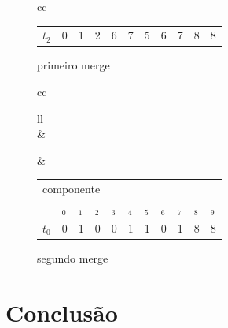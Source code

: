 \documentclass[12pt]{article}
\begin{document}
\begin{figure}[h!]
\begin{minipage}[b]{0.5\textwidth}
{\begin{tabular}{cc}
\begin{tabular}{lllllllllll}
\multicolumn{1}{l|}{$t_2$} & \multicolumn{1}{l|}{0} & \multicolumn{1}{l|}{1} & \multicolumn{1}{l|}{2} & \multicolumn{1}{l|}{6} & \multicolumn{1}{l|}{7} & \multicolumn{1}{l|}{5} & \multicolumn{1}{l|}{6} & \multicolumn{1}{l|}{7} & \multicolumn{1}{l|}{8} & \multicolumn{1}{l|}{8} \\ \cline{2-11} 
\end{tabular}
		\end{tabular}
		}
	    \caption{primeiro merge}
  	\end{minipage}
\end{figure}

\begin{figure}[h!]
	\centering
	\begin{minipage}[b]{0.5\textwidth}
		\resizebox{\textwidth}{!}
		{
			\begin{tabular}{cc}
			\begin{tabular}{ll}
                                                                                                                \\  
 &  \\  
\end{tabular} &
\begin{tabular}{lllllllllll}
\multicolumn{11}{l}{componente}                                                                                                                                                                                                                                                     \\
                           & $ _0$                  & $ _1$                  & $ _2$                  & $ _3$                  & $ _4$                  & $ _5$                  & $ _6$                  & $ _7$                  & $ _8$                  & $ _9$                  \\ \cline{2-11} 
\multicolumn{1}{l|}{$t_0$} & \multicolumn{1}{l|}{0} & \multicolumn{1}{l|}{1} & \multicolumn{1}{l|}{0} & \multicolumn{1}{l|}{0} & \multicolumn{1}{l|}{1} & \multicolumn{1}{l|}{1} & \multicolumn{1}{l|}{0} & \multicolumn{1}{l|}{1} & \multicolumn{1}{l|}{8} & \multicolumn{1}{l|}{8} \\ \cline{2-11} 
\end{tabular}
\end{tabular}
		}
	    \caption{segundo merge}
  	\end{minipage}
\end{figure}

{\color{gray}\lipsum[1]}

\section{Conclusão}

{\color{gray}\lipsum[1]}



\end{document}
